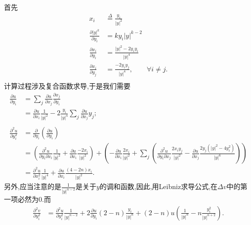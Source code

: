 \documentclass[12pt, a4paper]{ctexart}
\begin{document}
	首先
	\begin{align*}
	x_i &\stackrel{\Delta}{=} \frac{y_i}{|y|^2}\\
	\frac{\partial |y|^k}{\partial y_i} &= k  y_i  |y|^{k-2}\\
	\frac{\partial x_i}{\partial y_i} &= \frac{|y|^2-2y_iy_i}{|y|^4}\\
	\frac{\partial x_i}{\partial y_j} &= \frac{-2y_iy_j}{|y|^4},\qquad \forall i\neq j.\\
	\end{align*}
	计算过程涉及复合函数求导,于是我们需要
	\begin{align*}
	\frac{\partial u}{\partial y_i} &= \sum_j \frac{\partial u}{\partial x_j}\frac{\partial x_j}{\partial y_i} \\
	&= \frac{\partial u}{\partial x_i}\frac1{|y|^2} - 2\frac{y_i}{|y|^4}\sum_j\frac{\partial u}{\partial x_j}y_j;\\
	& \\
	\frac{\partial^2 u}{\partial y_i^2} &= \frac{\partial}{\partial y_i} (\frac{\partial u}{\partial y_i}) \\
	&= (\frac{\partial^2 u}{\partial y_i \partial x_i} \frac1{|y|^2} + \frac{\partial u}{\partial x_i}\frac{-2x_i}{|y|^2}) + (- \frac{\partial u}{\partial x_i}\frac{2x_i}{|y|^2} + \sum_j (\frac{\partial^2 u}{\partial y_i \partial x_j}\frac{2x_iy_j}{|y|^2} - \frac{\partial u}{\partial x_j}\frac{2y_j(|y|^2-4y_i^2)}{|y|^6})) \\
	&= \frac{\partial^2u}{\partial x_i^2}\frac1{|y|^4} + \frac{\partial u}{\partial x_i}\frac{(4-2n)x_i}{|y|^2}.
	\end{align*}
	另外,应当注意的是$\frac{1}{|y|^{n-2}}$是关于$y$的调和函数,因此,用Leibniz求导公式,在$\Delta v$中的第一项必然为0.而
	\begin{align*}
	\frac{\partial^2v}{\partial y_i^2} 
	&= \frac{\partial^2u}{\partial y_i^2}\frac1{|y|^{n-2}} + 2\frac{\partial u}{\partial y_i}(2-n)\frac{y_i}{|y|^n} +  (2-n) u  (\frac1{|y|^n} - n\frac{y_i^2}{|y|^{n+2}}).\\
	\end{align*}
\end{document}
